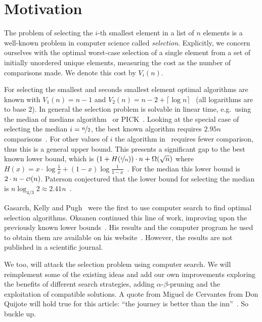 \documentclass[twoside,leqno,twocolumn]{article}
\newcommand\smallO{
\mathchoice
{{\scriptstyle\mathcal{O}}}%
{{\scriptstyle\mathcal{O}}}%
{{\scriptscriptstyle\mathcal{O}}}%
{\scalebox{.50}{$\scriptscriptstyle\mathcal{O}$}}%
}
\begin{document}
\section{Motivation} \label{sec:motivation}

The problem of selecting the $i$-th smallest element in a list of $n$ elements is a well-known problem in computer science called \textit{selection}.
Explicitly, we concern ourselves with the optimal worst-case selection of a single element from a set of initially unordered unique elements, measuring the cost as the number of comparisons made.
We denote this cost by $V_i(n)$.

For selecting the smallest and seconds smallest element optimal algorithms are known with $V_1(n) = n - 1$ and $V_2(n) = n - 2 + \lceil \log n\rceil$~\cite{Knuth1973} (all logarithms are to base $2$).
In general the selection problem is solvable in linear time, e.g.\ using the median of medians algorithm~\cite{Schoening1993} or PICK~\cite{Blum1972}.
Looking at the special case of selecting the median $i = \nicefrac{n}{2}$, the best known algorithm requires $2.95n$ comparisons~\cite{dor1999selecting}.
For other values of $i$ the algorithm in~\cite{dor1999selecting} requires fewer comparison, thus this is a general upper bound.
This presents a significant gap to the best known lower bound, which is $\left (1 + H(\nicefrac{i}{n}) \right ) \cdot n + \Omega(\sqrt n)$ where $H(x) = x \cdot \log \frac{1}{x} + (1 - x) \log \frac{1}{1 - x}$~\cite{bent1985finding}.
For the median this lower bound is $2 \cdot n - \smallO(n)$.
Paterson conjectured that the lower bound for selecting the median is $n \log_{4/3} 2 \approx 2.41n$~\cite{paterson1996progress}.

Gasarch, Kelly and Pugh~\cite{Gasarch1996} were the first to use computer search to find optimal selection algorithms.
Oksanen continued this line of work, improving upon the previously known lower bounds~\cite{Oksanen2006}.
His results and the computer program he used to obtain them are available on his website~\cite{Oksanen}.
However, the results are not published in a scientific journal.%

We too, will attack the selection problem using computer search.
We will reimplement some of the existing ideas and add our own improvements exploring the benefits of different search strategies, adding $\alpha$-$\beta$-pruning and the exploitation of compatible solutions.
A quote from Miguel de Cervantes from Don Quijote will hold true for this article: ``the journey is better than the inn''~\cite{cervantes_don_quijote}.
So buckle up.
\end{document}
